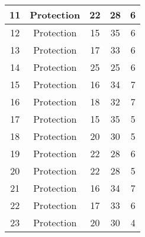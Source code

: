 \documentclass[results.tex]{subfiles}
\begin{document}
\begin{center}
\begin{tabular}{| c || c | c | c | c |}
            \hline
            11                      & Protection                   & 22                     & 28                      & 6                    \\
            \hline
            12                      & Protection                   & 15                     & 35                      & 6                    \\
            \hline
            13                      & Protection                   & 17                     & 33                      & 6                    \\
            \hline
            14                      & Protection                   & 25                     & 25                      & 6                    \\
            \hline
            15                      & Protection                   & 16                     & 34                      & 7                    \\
            \hline
            16                      & Protection                   & 18                     & 32                      & 7                    \\
            \hline
            17                      & Protection                   & 15                     & 35                      & 5                    \\
            \hline
            18                      & Protection                   & 20                     & 30                      & 5                    \\
            \hline
            19                      & Protection                   & 22                     & 28                      & 6                    \\
            \hline
            20                      & Protection                   & 22                     & 28                      & 5                    \\
            \hline
            21                      & Protection                   & 16                     & 34                      & 7                    \\
            \hline
            22                      & Protection                   & 17                     & 33                      & 6                    \\
            \hline
            23                      & Protection                   & 20                     & 30                      & 4                    \\

\end{tabular}
\end{center}
\end{document}
